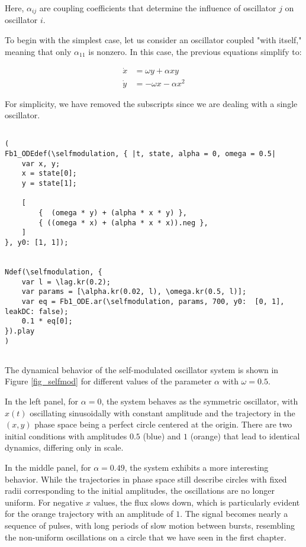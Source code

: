 \documentclass{article}
\begin{document}
Here, $\alpha_{ij}$ are coupling coefficients that determine the influence of oscillator $j$ on oscillator $i$.

To begin with the simplest case, let us consider an oscillator coupled "with itself," meaning that only $\alpha_{11}$ is nonzero. In this case, the previous equations simplify to:

\begin{subequations} \label{eq_self_coupled_oscillator}
\begin{align}
    \dot{x} & = \omega y + \alpha xy \\
    \dot{y} & = -\omega x - \alpha x^2
\end{align}
\end{subequations}

For simplicity, we have removed the subscripts since we are dealing with a single oscillator.


\begin{lstlisting}[caption=Sonification of a simple self coupled oscillator.]

(
Fb1_ODEdef(\selfmodulation, { |t, state, alpha = 0, omega = 0.5|
	var x, y;
	x = state[0];
	y = state[1];

	[
		{  (omega * y) + (alpha * x * y) },
		{ ((omega * x) + (alpha * x * x)).neg },
	]
}, y0: [1, 1]);


Ndef(\selfmodulation, {
	var l = \lag.kr(0.2);
	var params = [\alpha.kr(0.02, l), \omega.kr(0.5, l)];
	var eq = Fb1_ODE.ar(\selfmodulation, params, 700, y0:  [0, 1], leakDC: false);
	0.1 * eq[0];
}).play
)


\end{lstlisting}




The dynamical behavior of the self-modulated oscillator system is shown in Figure \ref{fig_selfmod} for different values of the parameter $\alpha$ with $\omega = 0.5$. 

In the left panel, for $\alpha = 0$, the system behaves as the symmetric oscillator, with $x(t)$ oscillating sinusoidally with constant amplitude and the trajectory in the $(x, y)$ phase space being a perfect circle centered at the origin. 
There are two initial conditions with amplitudes $0.5$ (blue) and $1$ (orange) that lead to identical dynamics, differing only in scale.

In the middle panel, for $\alpha = 0.49$, the system exhibits a more interesting behavior. 
While the trajectories in phase space still describe circles with fixed radii corresponding to the initial amplitudes, the oscillations are no longer uniform. For negative $x$ values, the flux slows down, which is particularly evident for the orange trajectory with an amplitude of $1$. 
The signal becomes nearly a sequence of pulses, with long periods of slow motion between bursts, resembling the non-uniform oscillations on a circle that we have seen in the first chapter. 
\end{document}
